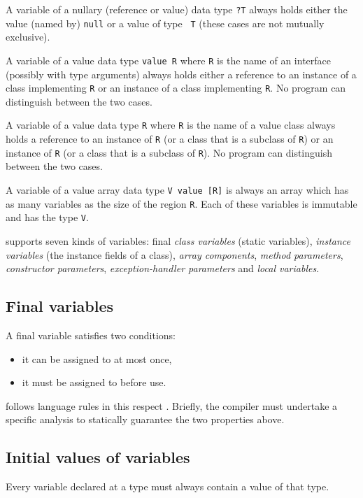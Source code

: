 A variable of a nullary (reference or value) data type {\tt ?T} always
holds either the value (named by) {\tt null} or a value of type {\tt
T} (these cases are not mutually exclusive).

A variable of a value data type {\tt value R} where {\tt R} is the
name of an interface (possibly with type arguments) always holds
either a reference to an instance of a class implementing {\tt R} or
an instance of a class implementing {\tt R}. No program can
distinguish between the two cases.

A variable of a value data type {\tt R} where {\tt R} is the name of a
value class always holds a reference to an instance of {\tt R} (or a
class that is a subclass of {\tt R}) or an instance of {\tt R} (or a
class that is a subclass of {\tt R}). No program can distinguish
between the two cases.

A variable of a value array data type {\tt V value [R]} is always an
array which has as many variables as the size of the region {\tt R}.
Each of these variables is immutable and has the type {\tt V}.

\Xten{} supports seven kinds of variables: final {\em class
variables} (static variables), {\em instance variables} (the instance
fields of a class), {\em array components}, {\em method parameters},
{\em constructor parameters}, {\em exception-handler parameters} and
{\em local variables}.

\subsection{Final variables}\label{FinalVariable}
A final variable satisfies two conditions: 
\begin{itemize}
\item it can be assigned to at most once, 
\item it must be assigned to before use. 
\end{itemize}

\Xten{} follows \java{} language rules in this respect \cite[\S
4.5.4,8.3.1.2,16]{jls2}. Briefly, the compiler must undertake a
specific analysis to statically guarantee the two properties above.


\subsection{Initial values of variables}
\label{NullaryConstructor}
Every variable declared at a type must always contain a value of that type.

